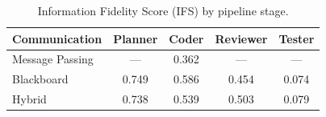 \begin{table}[t]
\centering
\caption{Information Fidelity Score (IFS) by pipeline stage.}
\label{tab:ifs}
\begin{tabular}{lcccc}
\toprule
\textbf{Communication} & \textbf{Planner} & \textbf{Coder} & \textbf{Reviewer} & \textbf{Tester} \\
\midrule
Message Passing & --- & 0.362 & --- & --- \\
Blackboard      & 0.749 & 0.586 & 0.454 & 0.074 \\
Hybrid          & 0.738 & 0.539 & 0.503 & 0.079 \\
\bottomrule
\end{tabular}
\end{table}